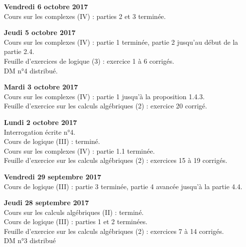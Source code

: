 \documentclass[12pt,a4paper]{article}
\begin{document}
\noindent\textbf{Vendredi 6 octobre 2017}\\
\bu{} Cours sur les complexes (IV) : parties 2 et 3 terminée. \\
\vspace{.4cm}

\noindent\textbf{Jeudi 5 octobre 2017}\\
\bu{} Cours sur les complexes (IV) : partie 1 terminée, partie 2 jusqu'au début de la partie 2.4. \\
\bu{} Feuille d'exercices de logique (3) : exercice 1 à 6 corrigés. \\
\bu{} DM n°4 distribué.\\
\vspace{.4cm}

\noindent\textbf{Mardi 3 octobre 2017}\\
\bu{} Cours sur les complexes (IV) : partie 1 jusqu'à la proposition 1.4.3. \\
\bu{} Feuille d'exercice sur les calculs algébriques (2) : exercice 20 corrigé. \\
\vspace{.4cm}

\noindent\textbf{Lundi 2 octobre 2017}\\
\bu{} Interrogation écrite n°4.\\
\bu{} Cours de logique (III) : terminé. \\
\bu{} Cours sur les complexes (IV) : partie 1.1 terminée. \\
\bu{} Feuille d'exercice sur les calculs algébriques (2) : exercices 15 à 19 corrigés. \\
\vspace{.4cm}

\noindent\textbf{Vendredi 29 septembre 2017}\\
\bu{} Cours de logique (III) : partie 3 terminée, partie 4 avancée jusqu'à la partie 4.4. \\
\vspace{.4cm}

\noindent\textbf{Jeudi 28 septembre 2017}\\
\bu{} Cours sur les calculs algébriques (II) : terminé. \\
\bu{} Cours de logique (III) : parties 1 et 2 terminées. \\
\bu{} Feuille d'exercice sur les calculs algébriques (2) : exercices 7 à 14 corrigés.  \\
\bu{} DM n°3 distribué\\
\vspace{.4cm}
\end{document}
